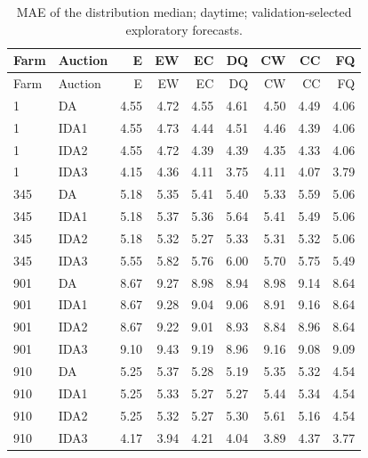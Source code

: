 \documentclass[11pt,a4paper]{article}
\begin{document}
\begin{longtable}{llrrrrrrr}
\caption{MAE of the distribution median; daytime; validation-selected exploratory forecasts.}\\
\toprule Farm & Auction & E & EW & EC & DQ & CW & CC & FQ \\
\midrule\endfirsthead
\toprule Farm & Auction & E & EW & EC & DQ & CW & CC & FQ \\
\midrule\endhead
1 & DA & 4.55 & 4.72 & 4.55 & 4.61 & 4.50 & 4.49 & 4.06 \\
1 & IDA1 & 4.55 & 4.73 & 4.44 & 4.51 & 4.46 & 4.39 & 4.06 \\
1 & IDA2 & 4.55 & 4.72 & 4.39 & 4.39 & 4.35 & 4.33 & 4.06 \\
1 & IDA3 & 4.15 & 4.36 & 4.11 & 3.75 & 4.11 & 4.07 & 3.79 \\
\midrule
345 & DA & 5.18 & 5.35 & 5.41 & 5.40 & 5.33 & 5.59 & 5.06 \\
345 & IDA1 & 5.18 & 5.37 & 5.36 & 5.64 & 5.41 & 5.49 & 5.06 \\
345 & IDA2 & 5.18 & 5.32 & 5.27 & 5.33 & 5.31 & 5.32 & 5.06 \\
345 & IDA3 & 5.55 & 5.82 & 5.76 & 6.00 & 5.70 & 5.75 & 5.49 \\
\midrule
901 & DA & 8.67 & 9.27 & 8.98 & 8.94 & 8.98 & 9.14 & 8.64 \\
901 & IDA1 & 8.67 & 9.28 & 9.04 & 9.06 & 8.91 & 9.16 & 8.64 \\
901 & IDA2 & 8.67 & 9.22 & 9.01 & 8.93 & 8.84 & 8.96 & 8.64 \\
901 & IDA3 & 9.10 & 9.43 & 9.19 & 8.96 & 9.16 & 9.08 & 9.09 \\
\midrule
910 & DA & 5.25 & 5.37 & 5.28 & 5.19 & 5.35 & 5.32 & 4.54 \\
910 & IDA1 & 5.25 & 5.33 & 5.27 & 5.27 & 5.44 & 5.34 & 4.54 \\
910 & IDA2 & 5.25 & 5.32 & 5.27 & 5.30 & 5.61 & 5.16 & 4.54 \\
910 & IDA3 & 4.17 & 3.94 & 4.21 & 4.04 & 3.89 & 4.37 & 3.77 \\
\midrule
\bottomrule\end{longtable}
\normalsize
\small
\end{document}
